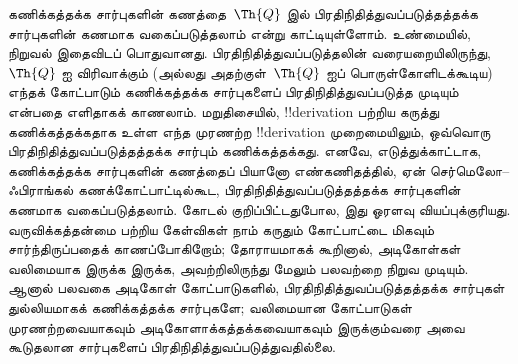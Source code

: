\documentclass[../../../include/open-logic-section]{subfiles}
\begin{document}
\begin{explain}
கணிக்கத்தக்க சார்புகளின் கணத்தை~$\Th{Q}$ இல் பிரதிநிதித்துவப்படுத்தத்தக்க
சார்புகளின் கணமாக வகைப்படுத்தலாம் என்று காட்டியுள்ளோம். உண்மையில், நிறுவல்
இதைவிடப் பொதுவானது. பிரதிநிதித்துவப்படுத்தலின் வரையறையிலிருந்து,
$\Th{Q}$ ஐ விரிவாக்கும் (அல்லது அதற்குள்~$\Th{Q}$ ஐப் பொருள்கோளிடக்கூடிய)
எந்தக் கோட்பாடும் கணிக்கத்தக்க சார்புகளைப் பிரதிநிதித்துவப்படுத்த முடியும்
என்பதை எளிதாகக் காணலாம். மறுதிசையில்,
!!{derivation} பற்றிய கருத்து கணிக்கத்தக்கதாக உள்ள எந்த முரணற்ற
!!{derivation} முறைமையிலும், ஒவ்வொரு பிரதிநிதித்துவப்படுத்தத்தக்க சார்பும்
கணிக்கத்தக்கது. எனவே, எடுத்துக்காட்டாக, கணிக்கத்தக்க சார்புகளின் கணத்தைப்
பியானோ எண்கணிதத்தில், ஏன் செர்மெலோ--ஃபிராங்கல் கணக்கோட்பாட்டில்கூட,
பிரதிநிதித்துவப்படுத்தத்தக்க சார்புகளின் கணமாக வகைப்படுத்தலாம். கோடல்
குறிப்பிட்டதுபோல, இது ஓரளவு வியப்புக்குரியது. வருவிக்கத்தன்மை பற்றிய
கேள்விகள் நாம் கருதும் கோட்பாட்டை மிகவும் சார்ந்திருப்பதைக் காணப்போகிறோம்;
தோராயமாகக் கூறினால், அடிகோள்கள் வலிமையாக இருக்க இருக்க, அவற்றிலிருந்து
மேலும் பலவற்றை நிறுவ முடியும். ஆனால் பலவகை அடிகோள் கோட்பாடுகளில்,
பிரதிநிதித்துவப்படுத்தத்தக்க சார்புகள் துல்லியமாகக் கணிக்கத்தக்க சார்புகளே;
வலிமையான கோட்பாடுகள் முரணற்றவையாகவும் அடிகோளாக்கத்தக்கவையாகவும்
இருக்கும்வரை அவை கூடுதலான சார்புகளைப் பிரதிநிதித்துவப்படுத்துவதில்லை.
\end{explain}
\end{document}
